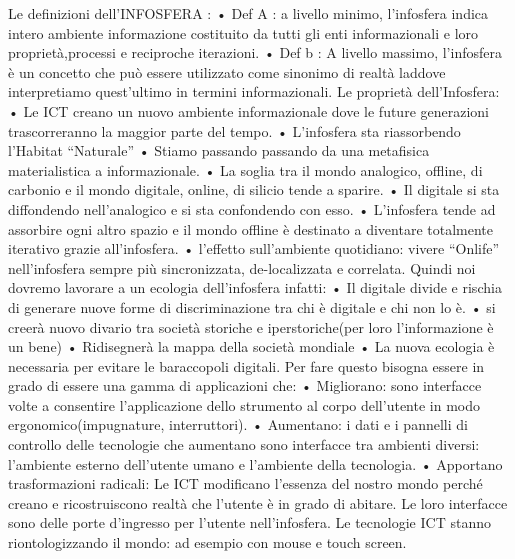 \documentclass[11pt, a4page, twocolumn]{article}
\begin{document}
Le definizioni dell’INFOSFERA : 
    • Def A : a livello minimo, l’infosfera indica intero ambiente informazione costituito da tutti gli enti informazionali e loro proprietà,processi e reciproche iterazioni.
    • Def b : A livello massimo, l’infosfera è un concetto che può essere utilizzato come sinonimo di realtà laddove interpretiamo quest’ultimo in termini informazionali.
Le proprietà dell’Infosfera:
    • Le ICT creano un nuovo ambiente informazionale dove le future generazioni trascorreranno la maggior parte del tempo.
    • L’infosfera sta riassorbendo l’Habitat “Naturale”
    • Stiamo passando passando da una metafisica materialistica a informazionale.
    • La soglia tra il mondo analogico, offline, di carbonio e il mondo digitale, online, di silicio tende a sparire.
    • Il digitale si sta diffondendo nell’analogico e si sta confondendo con esso.
    • L’infosfera tende ad assorbire ogni altro spazio e il mondo offline è destinato a diventare totalmente iterativo grazie all’infosfera.
    •  l’effetto sull’ambiente quotidiano: vivere “Onlife” nell’infosfera sempre più sincronizzata, de-localizzata e correlata.
Quindi noi dovremo lavorare a un ecologia dell’infosfera infatti:
    • Il digitale divide e rischia di generare nuove forme di discriminazione tra chi è digitale e chi non lo è.
    • si creerà nuovo divario tra società storiche e iperstoriche(per loro l’informazione è un bene)
    • Ridisegnerà la mappa della società mondiale
    • La nuova ecologia è necessaria per evitare le baraccopoli digitali.
Per fare questo bisogna essere in grado di essere una gamma di applicazioni che:
    • Migliorano: sono interfacce volte a consentire l’applicazione dello strumento al corpo dell’utente in modo ergonomico(impugnature, interruttori).
    • Aumentano: i dati e i pannelli di controllo delle tecnologie che aumentano sono interfacce tra ambienti diversi: l’ambiente esterno dell’utente umano e l’ambiente della tecnologia.
    • Apportano trasformazioni radicali: Le ICT modificano l’essenza del nostro mondo perché creano e ricostruiscono realtà che l’utente è in grado di abitare. Le loro interfacce sono delle porte d’ingresso per l’utente nell’infosfera.
Le tecnologie ICT stanno riontologizzando il mondo: ad esempio con mouse e touch screen.
\end{document}
